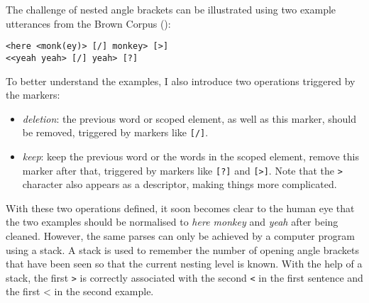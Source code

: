 The challenge of nested angle brackets can be illustrated using two example utterances from the Brown Corpus (\cite{brown1973}):

\texttt{<here <monk(ey)> [/] monkey> [>]}\\  %
\texttt{<<yeah yeah> [/] yeah> [?]} %

To better understand the examples, I also introduce two operations triggered by the markers:
\begin{itemize}
	\item \emph{deletion}: the previous word or scoped element, as well as this marker, should be removed, triggered by markers like \texttt{[/]}.
	\item \emph{keep}: keep the previous word or the words in the scoped element, remove this marker after that, triggered by markers like \texttt{[?]} and \texttt{[>]}. Note that the \texttt{>} character also appears as a descriptor, making things more complicated.
\end{itemize}

With these two operations defined, it soon becomes clear to the human eye that the two examples should be normalised to \emph{here monkey} and \emph{yeah} after being cleaned. However, the same parses can only be achieved by a computer program using a stack. A stack is used to remember the number of opening angle brackets that have been seen so that the current nesting level is known. With the help of a stack, the first \texttt{>} is correctly associated with the second \texttt{<} in the first sentence and the first {<} in the second example.




